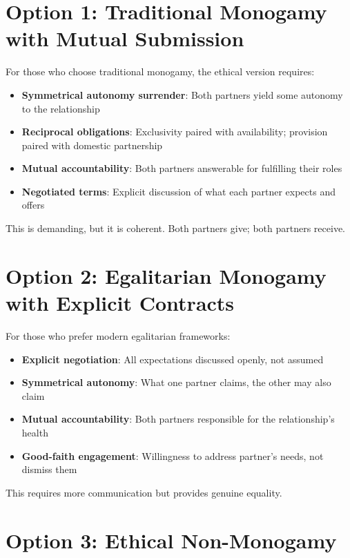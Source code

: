 \documentclass[12pt,openany]{book}
\numberwithin{equation}{chapter}
\begin{document}
\section{Option 1: Traditional Monogamy with Mutual Submission}

For those who choose traditional monogamy, the ethical version requires:

\begin{itemize}
    \item \textbf{Symmetrical autonomy surrender}: Both partners yield some autonomy to the relationship
    \item \textbf{Reciprocal obligations}: Exclusivity paired with availability; provision paired with domestic partnership
    \item \textbf{Mutual accountability}: Both partners answerable for fulfilling their roles
    \item \textbf{Negotiated terms}: Explicit discussion of what each partner expects and offers
\end{itemize}

This is demanding, but it is coherent. Both partners give; both partners receive.

\section{Option 2: Egalitarian Monogamy with Explicit Contracts}

For those who prefer modern egalitarian frameworks:

\begin{itemize}
    \item \textbf{Explicit negotiation}: All expectations discussed openly, not assumed
    \item \textbf{Symmetrical autonomy}: What one partner claims, the other may also claim
    \item \textbf{Mutual accountability}: Both partners responsible for the relationship's health
    \item \textbf{Good-faith engagement}: Willingness to address partner's needs, not dismiss them
\end{itemize}

This requires more communication but provides genuine equality.

\section{Option 3: Ethical Non-Monogamy}
\end{document}
